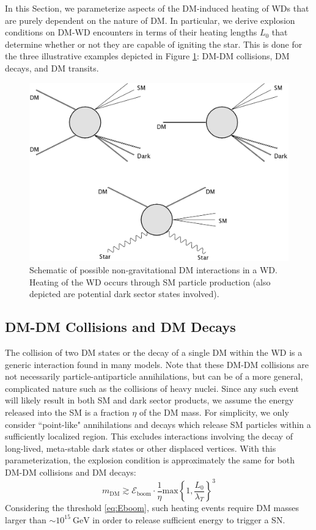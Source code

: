 \documentclass[twocolumn,showpacs,preprintnumbers,amsmath,amssymb,prd]{revtex4}
\newcommand{\Eboom}{\mathcal{E}_\text{boom}}
\newcommand{\GeV}{\text{GeV}}
\begin{document}
In this Section, we parameterize aspects of the DM-induced heating of WDs that are purely dependent on the nature of DM. 
In particular, we derive explosion conditions on DM-WD encounters in terms of their heating lengths $L_0$ that determine whether or not they are capable of igniting the star.
This is done for the three illustrative examples depicted in Figure \ref{fig:feynman}: DM-DM collisions, DM decays, and DM transits. 
\begin{figure}
\includegraphics[scale=0.09]{feynmandiag.jpg}
\caption{Schematic of possible non-gravitational DM interactions in a WD. Heating of the WD occurs through SM particle production (also depicted are potential dark sector states involved).}
\label{fig:feynman}
\end{figure}

\subsection{DM-DM Collisions and DM Decays}
\label{sec:DMcoldecay}

The collision of two DM states or the decay of a single DM within the WD is a generic interaction found in many models.
Note that these DM-DM collisions are not necessarily particle-antiparticle annihilations, but can be of a more general, complicated nature such as the collisions of heavy nuclei.
Since any such event will likely result in both SM and dark sector products, we assume the energy released into the SM is a fraction $\eta$ of the DM mass.
For simplicity, we only consider ``point-like" annihilations and decays which release SM particles within a sufficiently localized region. 
This excludes interactions involving the decay of long-lived, meta-stable dark states or other displaced vertices. 
With this parameterization, the explosion condition is approximately the same for both DM-DM collisions and DM decays:
\begin{equation}
\label{eq:coldecay}
    m_\text{DM} \gtrsim \Eboom \cdot \frac{1}{\eta}
      \text{max}\left\{1, \frac{L_0}{\lambda_T}\right\}^3
\end{equation}
Considering the threshold \eqref{eq:Eboom}, such heating events require DM masses larger than $\sim 10^{15} ~\GeV$ in order to release sufficient energy to trigger a SN.
\end{document}
